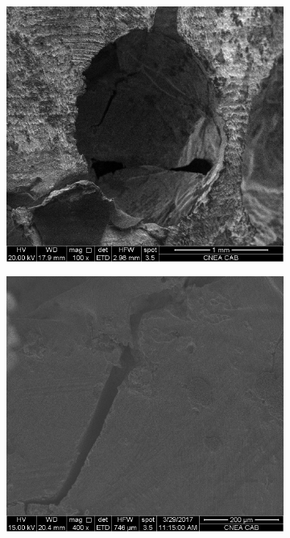 \documentclass[a4paper,12pt,fleqn,twoside,openany]{book}
\begin{document}
 \begin{figure}[h]
 \centering
    \begin{subfigure}{0.45\textwidth}
        \includegraphics[width=\textwidth]{Img/Introduccion/EsponjaA_004.jpg}
        \caption{}
        \label{fig:}
    \end{subfigure}
    \begin{subfigure}{0.45\textwidth}
        \includegraphics[width=\textwidth]{Img/Introduccion/EsponjaA_005.jpg}

\end{subfigure}
\end{figure}
\end{document}
